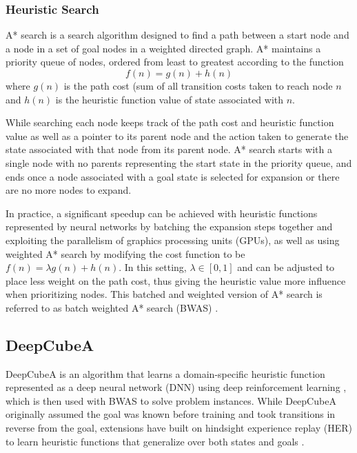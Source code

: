 \documentclass[letterpaper]{article} %
\begin{document}
\subsubsection{Heuristic Search}
A* search \cite{hart1968formal} is a search algorithm designed to find a path between a start node and a node in a set of goal nodes in a weighted directed graph. A* maintains a priority queue of nodes, ordered from least to greatest according to the function
\begin{equation}
    f(n)=g(n)+h(n)
\end{equation}
where $g(n)$ is the path cost (sum of all transition costs taken to reach node
$n$ and $h(n)$ is the heuristic function value of state associated with $n$.

While searching each node keeps track of the path cost and heuristic function value as well as a pointer to its parent node and the action taken to generate the state associated with that node from its parent node. A* search starts with a single node with no parents representing the start state in the priority queue, and ends once a node associated with a goal state is selected for expansion or there are no more nodes to expand.

In practice, a significant speedup can be achieved with heuristic functions represented by neural networks by batching the expansion steps together and exploiting the parallelism of graphics processing units (GPUs), as well as using weighted A* search \cite{pohl1970heuristic} by modifying the cost function to be $f(n)=\lambda g(n)+h(n)$. In this setting, $\lambda \in [0,1]$ and can be adjusted to place less weight on the path cost, thus giving the heuristic value more influence when prioritizing nodes. This batched and weighted version of A* search is referred to as batch weighted A* search (BWAS) \cite{agostinelli2019solving}.

\subsection{DeepCubeA}

DeepCubeA \cite{agostinelli2019solving} is an algorithm that learns a domain-specific heuristic function represented as a deep neural network (DNN) \cite{schmidhuber2015deep,lecun2015deep} using deep reinforcement learning \cite{sutton2018reinforcement}, which is then used with BWAS to solve problem instances. While DeepCubeA originally assumed the goal was known before training and took transitions in reverse from the goal, extensions have built on hindsight experience replay (HER) \cite{andrychowicz2017hindsight} to learn heuristic functions that generalize over both states and goals \cite{agostinelli2024specifying,agostinelli2024learning}.
\end{document}
